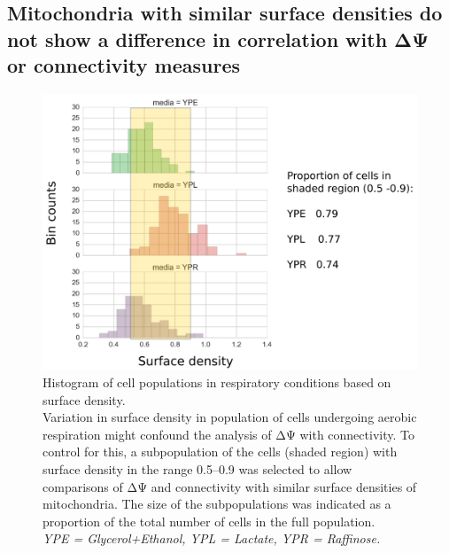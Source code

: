\subsection{Mitochondria with similar surface densities do not show a difference in correlation with ΔΨ or connectivity measures}
%
\begin{figure}[htp]
	\centering
    \hspace*{1.25in}\includegraphics[width=.65\textwidth]{hist}
    \caption[Histogram of cell populations in respiratory conditions based on surface density]{Histogram of cell populations in respiratory conditions based on surface density.\\Variation in surface density in population of cells undergoing aerobic respiration might confound the analysis of ΔΨ with connectivity. To control for this, a subpopulation of the cells (shaded region) with surface density in the range 0.5--0.9 was selected to allow comparisons of ΔΨ and connectivity with similar surface densities of mitochondria. The size of the subpopulations was indicated as a proportion of the total number of cells in the full population.\\\emph{YPE = Glycerol+Ethanol, YPL = Lactate, YPR = Raffinose.}}\label{fig:hist}
\end{figure}
%
%
